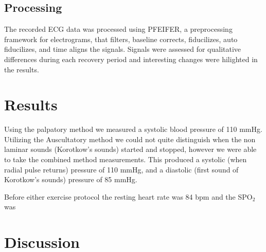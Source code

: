 \documentclass[12pt]{article}
\newcommand{\spo}{{SPO$_2$}}
\begin{document}
\subsection{Processing}
The recorded ECG data was processed using PFEIFER, a preprocessing framework for electrograms, that filters, baseline corrects, fiducilizes, auto fiducilizes, and time aligns the signals.\cite{MacLeod2018_p} Signals were assessed for qualitative differences during each recovery period and interesting changes were hilighted in the results.

\section{Results}
Using the palpatory method we measured a systolic blood pressure of 110 mmHg. Utilizing the Auscultatory method we could not quite distinguish when the non laminar sounds (Korotkow's sounds) started and stopped, however we were able to take the combined method measurements. This produced a systolic (when radial pulse returns) pressure of 110 mmHg, and a diastolic (first sound of Korotkow's sounds) pressure of 85 mmHg.

Before either exercise protocol the resting heart rate was 84 bpm and the \spo{} was 
\section{Discussion}




\end{document}
